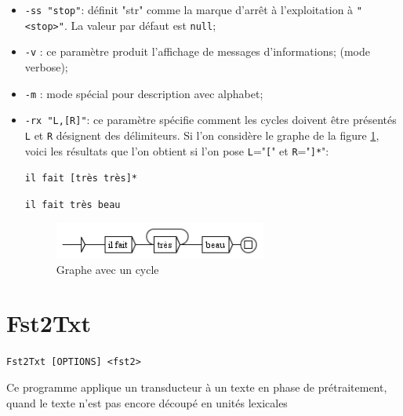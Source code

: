 \begin{itemize}
\item \verb$-ss "stop"$: définit "str" comme la marque d'arrêt à l'exploitation à \verb$"<stop>"$.
	La valeur par défaut est \verb$null$;

  \item \verb$-v$ : ce paramètre produit l’affichage de messages d’informations; (mode verbose);
  
  \item \verb$-m$ : mode spécial pour description avec alphabet;
  	  
  \item \verb$-rx "L,[R]"$: ce paramètre spécifie comment les cycles doivent être présentés \verb$L$ et \verb$R$ désignent des délimiteurs. Si l’on considère le graphe de la figure \ref{cycle},
  	  voici les résultats que l’on obtient si l’on pose \verb$L$="\verb$[$" et \verb$R$="\verb$]*$":

  \medskip
  \noindent
  \texttt{il fait [tr\`es tr\`es]*}
  
  \noindent
  \texttt{il fait tr\`es beau}

\begin{figure}[h]
\begin{center}
\includegraphics[width=7cm]{resources/img/fig10-1.png}
\caption{Graphe avec un cycle\label{cycle}}
\end{center}
\end{figure}

\end{itemize}







\section{Fst2Txt}
\label{section-Fst2Txt}
\verb+Fst2Txt [OPTIONS] <fst2>+

\bigskip
\noindent Ce programme applique un transducteur à un texte en phase de prétraitement, quand le
texte n’est pas encore découpé en unités lexicales

